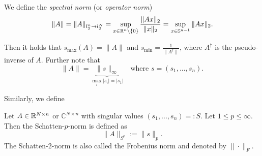 \begin{definition}
\begin{mdframed}
We define the \emph{spectral norm} (or \emph{operator norm})
\begin{equation*}
\|A\| = \|A\|_{l_2^n\to l_2^N} = \sup_{x\in \mathbb{R}^n\setminus \{0\}} \frac{\|Ax\|_2}{\|x\|_2} = \sup_{x\in \mathbb{S}^{n-1}}\|Ax\|_2.
\end{equation*}
\end{mdframed}
Then it holds that $s_{\max}(A) = \|A\|$ and $s_{\min} =  \frac{1}{\|A^{\dagger}\|}$, where $A^{\dagger}$ is the pseudo-inverse of $A$. Further note that
\begin{equation*}
\|A\| = \underbrace{\|s\|_\infty}_{\max_{i} |s_i| = |s_1|} \quad \text{where } s=(s_1,...,s_n).
\end{equation*}
\end{definition}
Similarly, we define
\begin{definition}
\begin{mdframed}
Let $A\in \mathbb{R}^{N \times n}$ or $\mathbb{C}^{N\times n}$ with singular values $(s_1,...,s_n)=:S$. Let $1 \leq p \leq \infty$. Then the Schatten-$p$-norm is defined as 
\begin{equation*}
\|A\|_{S^p} := \|s\|_p.
\end{equation*}
The Schatten-2-norm is also called the Frobenius norm and denoted by $\|\cdot\|_F$.
\end{mdframed}
\end{definition}

